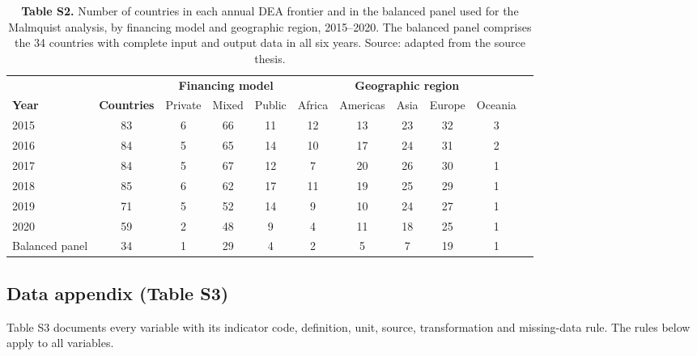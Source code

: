 \documentclass[11pt,letterpaper]{article}
\begin{document}
\begin{table}[htbp]
\footnotesize
\caption{\textbf{Table S2.} Number of countries in each annual DEA frontier and in the balanced panel used for the Malmquist analysis, by financing model and geographic region, 2015--2020. The balanced panel comprises the 34 countries with complete input and output data in all six years. Source: adapted from the source thesis.\citep{valenzuela2024}}
\begin{tabular}{@{}lcccccccccc@{}}
\toprule
& & \multicolumn{3}{c}{\textbf{Financing model}} & \multicolumn{5}{c}{\textbf{Geographic region}} \\
\cmidrule(lr){3-5}\cmidrule(lr){6-10}
\textbf{Year} & \textbf{Countries} & Private & Mixed & Public & Africa & Americas & Asia & Europe & Oceania \\
\midrule
2015 & 83 & 6 & 66 & 11 & 12 & 13 & 23 & 32 & 3 \\
2016 & 84 & 5 & 65 & 14 & 10 & 17 & 24 & 31 & 2 \\
2017 & 84 & 5 & 67 & 12 & 7 & 20 & 26 & 30 & 1 \\
2018 & 85 & 6 & 62 & 17 & 11 & 19 & 25 & 29 & 1 \\
2019 & 71 & 5 & 52 & 14 & 9 & 10 & 24 & 27 & 1 \\
2020 & 59 & 2 & 48 & 9 & 4 & 11 & 18 & 25 & 1 \\
Balanced panel & 34 & 1 & 29 & 4 & 2 & 5 & 7 & 19 & 1 \\
\bottomrule
\end{tabular}
\end{table}

\clearpage
\subsection*{Data appendix (Table S3)}

Table S3 documents every variable with its indicator code, definition, unit, source, transformation and missing-data rule. The rules below apply to all variables.
\end{document}
